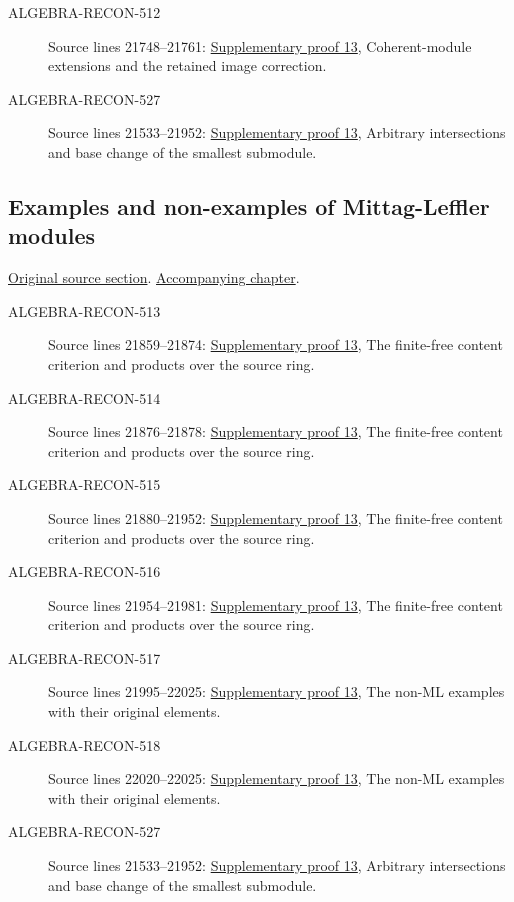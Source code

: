 \begin{description}
\item[ALGEBRA-RECON-512] Source lines 21748--21761: \hyperlink{algebra_ml_coherent_notes_20260927}{Supplementary proof 13}, Coherent-module extensions and the retained image correction.
\item[ALGEBRA-RECON-527] Source lines 21533--21952: \hyperlink{algebra_ml_coherent_notes_20260927}{Supplementary proof 13}, Arbitrary intersections and base change of the smallest submodule.
\end{description}

\subsection{Examples and non-examples of Mittag-Leffler modules}
\hypertarget{algebra-source-section-examples}{}
\noindent\href{https://github.com/stacks/stacks-project/blob/a04446e57ec1fbc252a871afcec7752fb2807b14/algebra.tex\#L21852}{Original source section}. \href{algebra.pdf\#nameddest=section-examples}{Accompanying chapter}.

\begin{description}
\item[ALGEBRA-RECON-513] Source lines 21859--21874: \hyperlink{algebra_ml_coherent_notes_20260927}{Supplementary proof 13}, The finite-free content criterion and products over the source ring.
\item[ALGEBRA-RECON-514] Source lines 21876--21878: \hyperlink{algebra_ml_coherent_notes_20260927}{Supplementary proof 13}, The finite-free content criterion and products over the source ring.
\item[ALGEBRA-RECON-515] Source lines 21880--21952: \hyperlink{algebra_ml_coherent_notes_20260927}{Supplementary proof 13}, The finite-free content criterion and products over the source ring.
\item[ALGEBRA-RECON-516] Source lines 21954--21981: \hyperlink{algebra_ml_coherent_notes_20260927}{Supplementary proof 13}, The finite-free content criterion and products over the source ring.
\item[ALGEBRA-RECON-517] Source lines 21995--22025: \hyperlink{algebra_ml_coherent_notes_20260927}{Supplementary proof 13}, The non-ML examples with their original elements.
\item[ALGEBRA-RECON-518] Source lines 22020--22025: \hyperlink{algebra_ml_coherent_notes_20260927}{Supplementary proof 13}, The non-ML examples with their original elements.
\item[ALGEBRA-RECON-527] Source lines 21533--21952: \hyperlink{algebra_ml_coherent_notes_20260927}{Supplementary proof 13}, Arbitrary intersections and base change of the smallest submodule.
\end{description}

